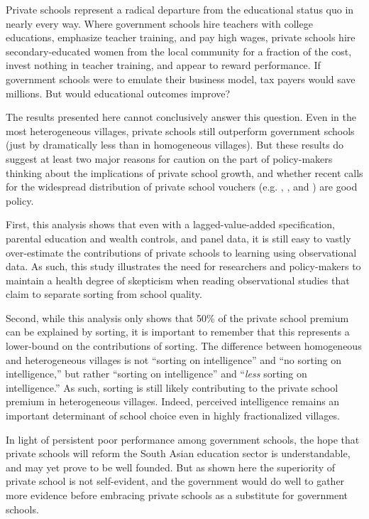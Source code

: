 \documentclass[Eubank_pk_ethnic_sorting.tex]{subfiles}
\begin{document}
Private schools represent a radical departure from the educational status quo in nearly every way. Where government schools hire teachers with college educations, emphasize teacher training, and pay high wages, private schools hire secondary-educated women from the local community for a fraction of the cost, invest nothing in teacher training, and appear to reward performance. If government schools were to emulate their business model, tax payers would save millions. But would educational outcomes improve? 

The results presented here cannot conclusively answer this question. Even in the most heterogeneous villages, private schools still outperform government schools (just by dramatically less than in homogeneous villages). But these results do suggest at least two major reasons for caution on the part of policy-makers thinking about the implications of private school growth, and whether recent calls for the widespread distribution of private school vouchers (e.g. \cite{Chakrabarti:2008vc}, \cite{Kelkar:2006tq}, and \cite{Panagariya:2008wi}) are good policy.

First, this analysis shows that even with a lagged-value-added specification, parental education and wealth controls, and panel data, it is still easy to vastly over-estimate the contributions of private schools to learning using observational data. As such, this study illustrates the need for researchers and policy-makers to maintain a health degree of skepticism when reading observational studies that claim to separate sorting from school quality.

Second, while this analysis only shows that 50\% of the private school premium can be explained by sorting, it is important to remember that this represents a lower-bound on the contributions of sorting. The difference between homogeneous and heterogeneous villages is not ``sorting on intelligence'' and ``no sorting on intelligence,'' but rather ``sorting on intelligence'' and ``\emph{less} sorting on intelligence.'' As such, sorting is still likely contributing to the private school premium in heterogeneous villages. Indeed, perceived intelligence remains an important determinant of school choice even in highly fractionalized villages. 

In light of persistent poor performance among government schools, the hope that private schools will reform the South Asian education sector is understandable, and may yet prove to be well founded. But as shown here the superiority of private school is not self-evident, and the government would do well to gather more evidence before embracing private schools as a substitute for government schools. 
\end{document}
